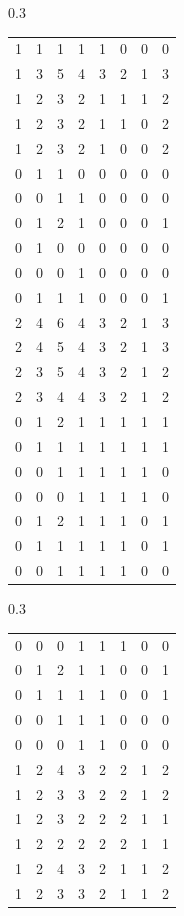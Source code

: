 \documentclass{amsart}
\theoremstyle{definition}
\theoremstyle{remark}
\numberwithin{equation}{section}
\begin{document}
\begin{table}[h]
\begin{subtable}{0.3\textwidth}
\begin{tabular}{llllllll}
1 & 1 & 1 & 1 & 1 & 0 & 0 & 0 \\
1 & 3 & 5 & 4 & 3 & 2 & 1 & 3 \\
1 & 2 & 3 & 2 & 1 & 1 & 1 & 2 \\
1 & 2 & 3 & 2 & 1 & 1 & 0 & 2 \\
1 & 2 & 3 & 2 & 1 & 0 & 0 & 2 \\
0 & 1 & 1 & 0 & 0 & 0 & 0 & 0 \\
0 & 0 & 1 & 1 & 0 & 0 & 0 & 0 \\
0 & 1 & 2 & 1 & 0 & 0 & 0 & 1 \\
0 & 1 & 0 & 0 & 0 & 0 & 0 & 0 \\
0 & 0 & 0 & 1 & 0 & 0 & 0 & 0 \\
0 & 1 & 1 & 1 & 0 & 0 & 0 & 1 \\
2 & 4 & 6 & 4 & 3 & 2 & 1 & 3 \\
2 & 4 & 5 & 4 & 3 & 2 & 1 & 3 \\
2 & 3 & 5 & 4 & 3 & 2 & 1 & 2 \\
2 & 3 & 4 & 4 & 3 & 2 & 1 & 2 \\
0 & 1 & 2 & 1 & 1 & 1 & 1 & 1 \\
0 & 1 & 1 & 1 & 1 & 1 & 1 & 1 \\
0 & 0 & 1 & 1 & 1 & 1 & 1 & 0 \\
0 & 0 & 0 & 1 & 1 & 1 & 1 & 0 \\
0 & 1 & 2 & 1 & 1 & 1 & 0 & 1 \\
0 & 1 & 1 & 1 & 1 & 1 & 0 & 1 \\
0 & 0 & 1 & 1 & 1 & 1 & 0 & 0
\end{tabular}
\end{subtable}
\begin{subtable}{0.3\textwidth}
\centering
\begin{tabular}{llllllll}
0 & 0 & 0 & 1 & 1 & 1 & 0 & 0 \\
0 & 1 & 2 & 1 & 1 & 0 & 0 & 1 \\
0 & 1 & 1 & 1 & 1 & 0 & 0 & 1 \\
0 & 0 & 1 & 1 & 1 & 0 & 0 & 0 \\
0 & 0 & 0 & 1 & 1 & 0 & 0 & 0 \\
1 & 2 & 4 & 3 & 2 & 2 & 1 & 2 \\
1 & 2 & 3 & 3 & 2 & 2 & 1 & 2 \\
1 & 2 & 3 & 2 & 2 & 2 & 1 & 1 \\
1 & 2 & 2 & 2 & 2 & 2 & 1 & 1 \\
1 & 2 & 4 & 3 & 2 & 1 & 1 & 2 \\
1 & 2 & 3 & 3 & 2 & 1 & 1 & 2 \\

\end{tabular}
\end{subtable}
\end{table}
\end{document}
